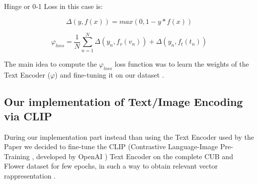 Hinge or 0-1 Loss in this case is:

\begin{equation}
    \Delta( y, f(x) ) = max (0 , 1 - y * f(x) )
\end{equation}



\begin{equation}
    \varphi_{loss} = \frac{1}{N} \sum_{n=1}^{N} \Delta(y_n, f_v(v_n)) + \Delta(y_n, f_t(t_n)) 
\end{equation}

The main idea to compute the $\varphi_{loss}$ loss function was to learn the weights of 
the Text Encoder ($\varphi$) and fine-tuning it on our dataset .

\subsection*{Our implementation of Text/Image Encoding via CLIP}
During our implementation part instead than using the Text Encoder used by 
the Paper we decided to fine-tune the CLIP (Contrastive Language-Image Pre-Training , developed by OpenAI ) Text Encoder on the 
complete CUB and Flower dataset for few epochs, in such a way to obtain 
relevant vector rappresentation .
